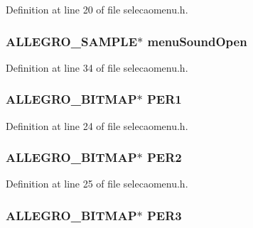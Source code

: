 Definition at line 20 of file selecaomenu.\-h.

\hypertarget{structlg_images_a4281ee5c3e4bde427f0549271dcf92e9}{
\subsubsection[{menu\-Sound\-Open}]{\setlength{\rightskip}{0pt plus 5cm}A\-L\-L\-E\-G\-R\-O\-\_\-\-S\-A\-M\-P\-L\-E$\ast$ menu\-Sound\-Open}}\label{structlg_images_a4281ee5c3e4bde427f0549271dcf92e9}


Definition at line 34 of file selecaomenu.\-h.

\hypertarget{structlg_images_afbf7d912689bf672658e2196ba1c36a1}{
\subsubsection[{P\-E\-R1}]{\setlength{\rightskip}{0pt plus 5cm}A\-L\-L\-E\-G\-R\-O\-\_\-\-B\-I\-T\-M\-A\-P$\ast$ P\-E\-R1}}\label{structlg_images_afbf7d912689bf672658e2196ba1c36a1}


Definition at line 24 of file selecaomenu.\-h.

\hypertarget{structlg_images_a8b18e2d20f8b610e44bc273533843b47}{
\subsubsection[{P\-E\-R2}]{\setlength{\rightskip}{0pt plus 5cm}A\-L\-L\-E\-G\-R\-O\-\_\-\-B\-I\-T\-M\-A\-P$\ast$ P\-E\-R2}}\label{structlg_images_a8b18e2d20f8b610e44bc273533843b47}


Definition at line 25 of file selecaomenu.\-h.

\hypertarget{structlg_images_a2a5acaeabc1157693a8fb90858bf8c92}{
\subsubsection[{P\-E\-R3}]{\setlength{\rightskip}{0pt plus 5cm}A\-L\-L\-E\-G\-R\-O\-\_\-\-B\-I\-T\-M\-A\-P$\ast$ P\-E\-R3}}\label{structlg_images_a2a5acaeabc1157693a8fb90858bf8c92}


